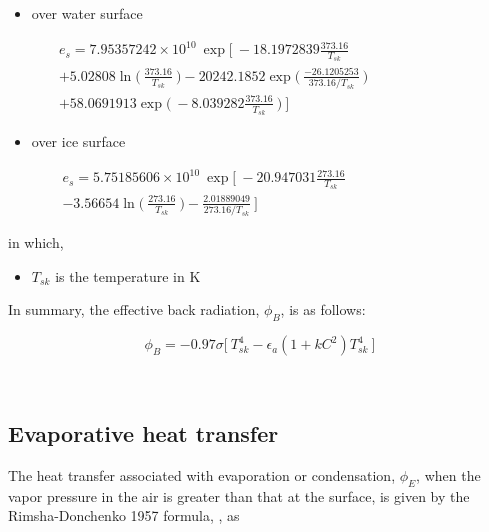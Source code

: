 \begin{itemize}
	\renewcommand{\labelitemi}{\textbullet}
	\item over water surface
\end{itemize}
\begin{equation} \label{eq:esw}
  \begin{split}
e_s = 7.95357242\times 10^{10}
     \ \exp \bigg[\ -18.1972839\frac{373.16}{T_{sk}} \qquad \qquad  \qquad \qquad \\
 + 5.02808 \ln\Big(\ \frac{373.16}{T_{sk}}\ \Big) -20242.1852 \exp\Big(\ \frac{-26.1205253}{373.16/T_{sk}}\ \Big)  \qquad \\
 + 58.0691913 \exp\Big(\ -8.039282\frac{373.16}{T_{sk}}\ \Big) \ \bigg]
  \end{split}
\end{equation}

\begin{itemize}
	\renewcommand{\labelitemi}{\textbullet}
	\item over ice surface
\end{itemize}
\begin{equation} \label{eq:esi}
   \begin{split}
e_s = 5.75185606\times 10^{10}
     \ \exp \bigg[\ -20.947031\frac{273.16}{T_{sk}}\qquad \qquad  \qquad \qquad \\
      -3.56654 \ln\Big(\ \frac{273.16}{T_{sk}}\ \Big) - \frac{2.01889049}{273.16/T_{sk}}\ \bigg]
   \end{split}
\end{equation}

in which,
\begin{itemize}
	\item $T_{sk}$ is the temperature in K
\end{itemize}

In summary, the effective back radiation, $\phi_B$, is as follows:

\begin{equation} \label{eq:phiball}
\phi_B=-0.97\sigma\Big[\ T_{sk}^4-\epsilon_a ( 1+kC^2 ) T_{sk}^4\ \Big]
\end{equation}

~\newline
\subsection{Evaporative heat transfer}

The heat transfer associated with evaporation or condensation, $\phi_E$, when the vapor pressure in the air is greater than that at the surface, is given by the Rimsha-Donchenko 1957 formula, \cite{rimsha1957investigation}, as

